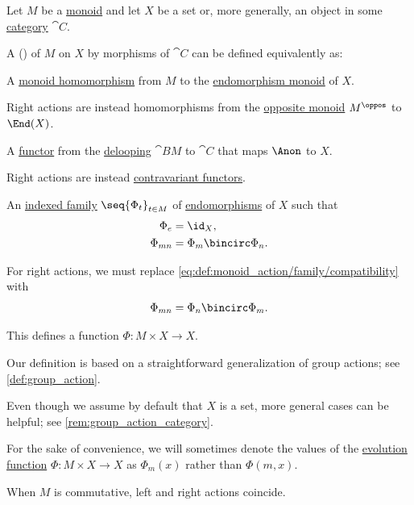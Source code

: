 \begin{definition}\label{def:monoid_action}\mimprovised
  Let \( M \) be a \hyperref[def:monoid]{monoid} and let \( X \) be a set or, more generally, an object in some \hyperref[def:category]{category} \( \cat{C} \).

  A ()  of \( M \) on \( X \) by morphisms of \( \cat{C} \) can be defined equivalently as:
  \begin{thmenum}
     A \hyperref[def:monoid/morphism]{monoid homomorphism} from \( M \) to the \hyperref[def:endomorphism_monoid]{endomorphism monoid} of \( X \).

    Right actions are instead homomorphisms from the \hyperref[def:monoid/opposite]{opposite monoid} \( M^\oppos \) to \( \End(X) \).

     A \hyperref[def:functor]{functor} from the \hyperref[def:monoid_delooping]{delooping} \( \cat{B} M \) to \( \cat{C} \) that maps \( \Anon \) to \( X \).

    Right actions are instead \hyperref[def:contravariant_functor]{contravariant functors}.

     An \hyperref[def:indexed_family]{indexed family} \( \seq{ \Phi_t }_{t \in M} \) of \hyperref[def:categorical_endomorphism]{endomorphisms} of \( X \) such that
    \begin{align}
      \Phi_e    &= \id_X,                  \label{eq:def:monoid_action/family/identity} \\
      \Phi_{mn} &= \Phi_m \bincirc \Phi_n. \label{eq:def:monoid_action/family/compatibility}
    \end{align}

    For right actions, we must replace \eqref{eq:def:monoid_action/family/compatibility} with
    \begin{equation}\label{eq:def:monoid_action/family/compatibility_right}
      \Phi_{mn} = \Phi_n \bincirc \Phi_m.
    \end{equation}

    This defines a function \( \Phi: M \times X \to X \).
  \end{thmenum}
\end{definition}
\begin{comments}
  \item Our definition is based on a straightforward generalization of group actions; see \cref{def:group_action}.
  \item Even though we assume by default that \( X \) is a set, more general cases can be helpful; see \cref{rem:group_action_category}.
  \item For the sake of convenience, we will sometimes denote the values of the \hyperref[def:monoid_action]{evolution function} \( \Phi: M \times X \to X \) as \( \Phi_m(x) \) rather than \( \Phi(m, x) \).

  \item When \( M \) is commutative, left and right actions coincide.
\end{comments}
